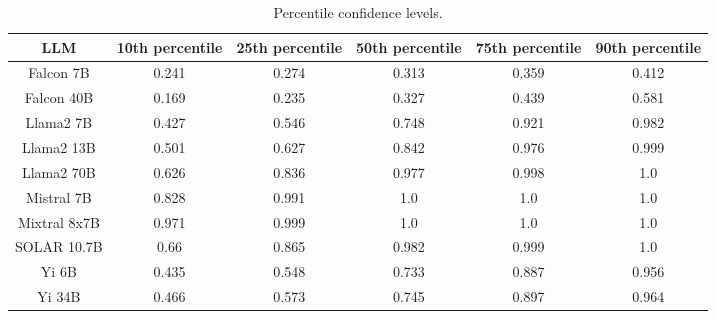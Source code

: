 \begin{table*}
\centering
\begin{tabular}{c|c|c|c|c|c}
LLM & 10th percentile & 25th percentile & 50th percentile & 75th percentile & 90th percentile\\ \hline
Falcon 7B & 0.241 & 0.274 & 0.313 & 0.359 & 0.412\\
Falcon 40B & 0.169 & 0.235 & 0.327 & 0.439 & 0.581\\
Llama2 7B & 0.427 & 0.546 & 0.748 & 0.921 & 0.982\\
Llama2 13B & 0.501 & 0.627 & 0.842 & 0.976 & 0.999\\
Llama2 70B & 0.626 & 0.836 & 0.977 & 0.998 & 1.0\\
Mistral 7B & 0.828 & 0.991 & 1.0 & 1.0 & 1.0\\
Mixtral 8x7B & 0.971 & 0.999 & 1.0 & 1.0 & 1.0\\
SOLAR 10.7B & 0.66 & 0.865 & 0.982 & 0.999 & 1.0\\
Yi 6B & 0.435 & 0.548 & 0.733 & 0.887 & 0.956\\
Yi 34B & 0.466 & 0.573 & 0.745 & 0.897 & 0.964\\
\hline
\end{tabular}
\caption{Percentile confidence levels.}
\label{tab:percentile_conf}
\end{table*}
